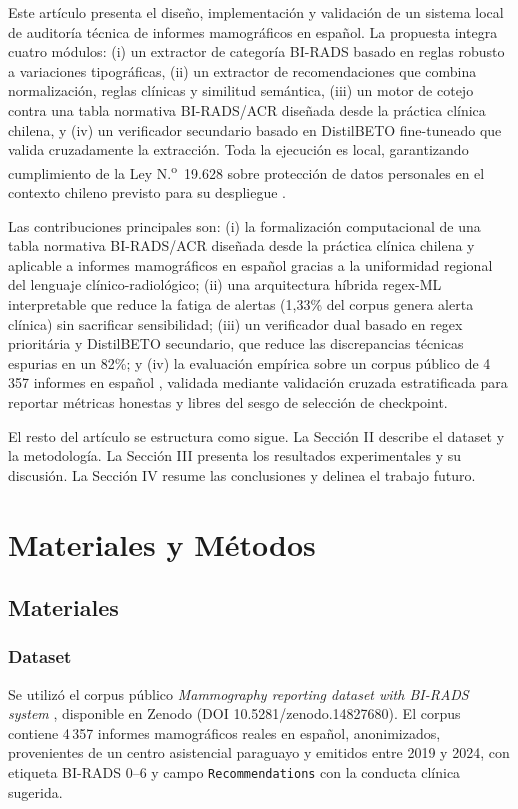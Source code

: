 \documentclass[10pt,journal,a4paper]{IEEEtran}
\begin{document}
Este art\'iculo presenta el dise\~no, implementaci\'on y validaci\'on de un sistema local de auditor\'ia t\'ecnica de informes mamogr\'aficos en espa\~nol. La propuesta integra cuatro m\'odulos: (i) un extractor de categor\'ia BI-RADS basado en reglas robusto a variaciones tipogr\'aficas, (ii) un extractor de recomendaciones que combina normalizaci\'on, reglas cl\'inicas y similitud sem\'antica, (iii) un motor de cotejo contra una tabla normativa BI-RADS/ACR dise\~nada desde la pr\'actica cl\'inica chilena, y (iv) un verificador secundario basado en DistilBETO fine-tuneado que valida cruzadamente la extracci\'on. Toda la ejecuci\'on es local, garantizando cumplimiento de la Ley N.\textsuperscript{o}~19.628 sobre protecci\'on de datos personales en el contexto chileno previsto para su despliegue \cite{ley19628}.

Las contribuciones principales son: (i) la formalizaci\'on computacional de una tabla normativa BI-RADS/ACR dise\~nada desde la pr\'actica cl\'inica chilena y aplicable a informes mamogr\'aficos en espa\~nol gracias a la uniformidad regional del lenguaje cl\'inico-radiol\'ogico; (ii) una arquitectura h\'ibrida regex-ML interpretable que reduce la fatiga de alertas (1,33\% del corpus genera alerta cl\'inica) sin sacrificar sensibilidad; (iii) un verificador dual basado en regex priorit\'aria y DistilBETO secundario, que reduce las discrepancias t\'ecnicas espurias en un 82\%; y (iv) la evaluaci\'on emp\'irica sobre un corpus p\'ublico de 4\,357 informes en espa\~nol \cite{vazquez2025}, validada mediante validaci\'on cruzada estratificada para reportar m\'etricas honestas y libres del sesgo de selecci\'on de checkpoint.

El resto del art\'iculo se estructura como sigue. La Secci\'on II describe el dataset y la metodolog\'ia. La Secci\'on III presenta los resultados experimentales y su discusi\'on. La Secci\'on IV resume las conclusiones y delinea el trabajo futuro.

\section{Materiales y M\'etodos}

\subsection{Materiales}

\subsubsection{Dataset}
Se utiliz\'o el corpus p\'ublico \emph{Mammography reporting dataset with BI-RADS system} \cite{vazquez2025}, disponible en Zenodo (DOI 10.5281/zenodo.14827680). El corpus contiene 4\,357 informes mamogr\'aficos reales en espa\~nol, anonimizados, provenientes de un centro asistencial paraguayo y emitidos entre 2019 y 2024, con etiqueta BI-RADS 0--6 y campo \texttt{Recommendations} con la conducta cl\'inica sugerida.
\end{document}
